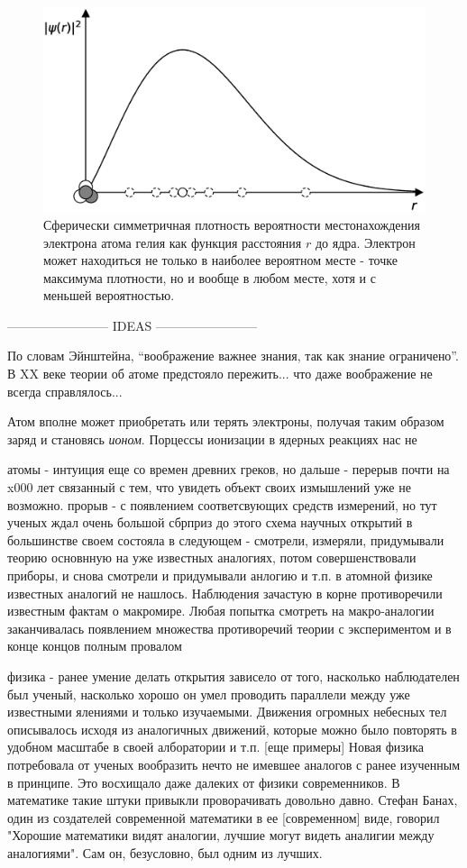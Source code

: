 \begin{figure}[t!]
   \centering
   \includegraphics[scale=0.4]{images/radial_prob}
   \caption{Сферически симметричная плотность вероятности местонахождения электрона атома гелия как функция расстояния $r$ до ядра. Электрон может находиться не только в наиболее вероятном месте - точке максимума плотности, но и вообще в любом месте, хотя и с меньшей вероятностью.}
   \label{fig:radial_prob}
\end{figure}


------------------------ IDEAS ------------------------ 

По словам Эйнштейна, ``воображение важнее знания, так как знание ограничено''.
В XX веке теории об атоме предстояло пережить... что даже воображение не всегда справлялось...


Атом вполне может приобретать или терять электроны, получая таким образом заряд и становясь \textit{ионом}.
Порцессы ионизации в ядерных реакциях нас не 



атомы - интуиция еще со времен древних греков, но дальше - перерыв почти на x000 лет связанный с тем, что увидеть объект своих измышлений уже не возможно.
прорыв - с появлением соответсвующих средств измерений, но тут ученых ждал очень большой сбрприз
до этого схема научных открытий в большинстве своем состояла в следующем - смотрели, измеряли, придумывали теорию основнную на уже известных аналогиях, потом совершенствовали приборы, и снова смотрели и придумывали анлогию и т.п.
в атомной физике известных аналогий не нашлось. Наблюдения зачастую в корне противоречили известным фактам о макромире. Любая попытка смотреть на макро-аналогии заканчивалась появлением множества противоречий теории с экспериментом и в конце концов полным провалом 


физика - ранее умение делать открытия зависело от того, насколько наблюдателен был ученый, насколько хорошо он умел проводить параллели между уже известными ялениями и только изучаемыми.
Движения огромных небесных тел описывалось исходя из аналогичных движений, которые можно было повторять в удобном масштабе в своей алборатории и т.п. [еще примеры]
Новая физика потребовала от ученых вообразить нечто не имевшее аналогов с ранее изученным в принципе. 
Это восхищало даже далеких от физики современников.
В математике такие штуки привыкли проворачивать довольно давно. 
Стефан Банах, один из создателей современной математики в ее [современном] виде, говорил "Хорошие математики видят аналогии, лучшие могут видеть аналигии между аналогиями". Сам он, безусловно, был одним из лучших.


